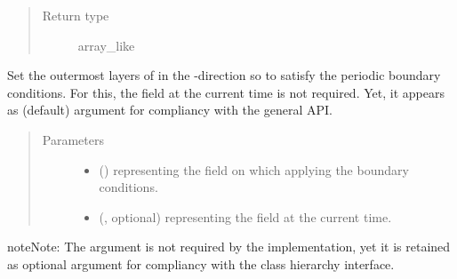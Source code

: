 \documentclass[letterpaper,10pt,english]{sphinxmanual}
\begin{document}
\begin{fulllineitems}
\begin{fulllineitems}
\begin{quote}
\begin{description}
\item[{Return type}] \leavevmode
array\_like

\end{description}\end{quote}

\end{fulllineitems}


\begin{fulllineitems}
\label{\detokenize{api:dycore.horizontal_boundary.Periodic.set_outermost_layers_x}}
Set the outermost layers of  in the -direction so to satisfy the periodic
boundary conditions. For this, the field  at the current time is not required. Yet,
it appears as (default) argument for compliancy with the general API.
\begin{quote}\begin{description}
\item[{Parameters}] \leavevmode\begin{itemize}
\item {} 
 () \textendash{}  representing the field on which applying the boundary conditions.

\item {} 
 (, optional) \textendash{}  representing the field at the current time.

\end{itemize}

\end{description}\end{quote}

\begin{sphinxadmonition}{note}{Note:}
The argument  is not required by the implementation, yet it is retained as optional
argument for compliancy with the class hierarchy interface.
\end{sphinxadmonition}


\end{fulllineitems}
\end{fulllineitems}
\end{document}
